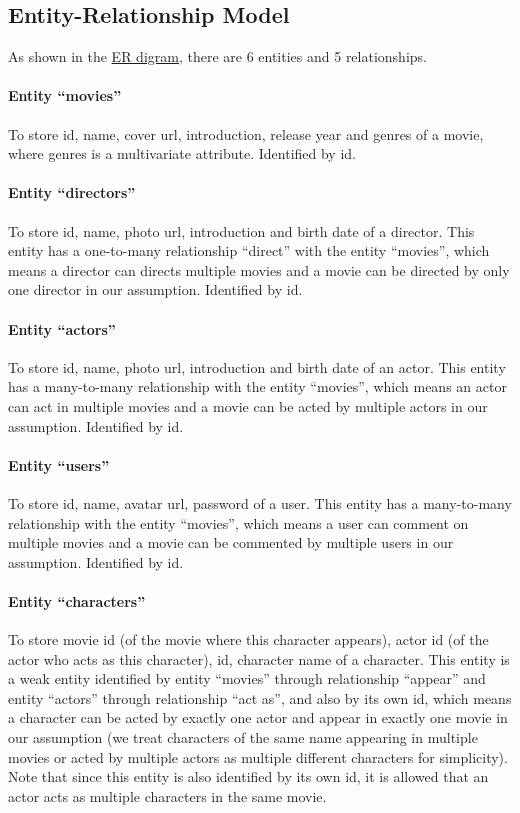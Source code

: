 \begin{CJK*}{UTF8}{gbsn}
\subsection{Entity-Relationship Model}
As shown in the \hyperref[ERD]{ER digram}, there are 6 entities and 5 relationships. 
\paragraph{Entity ``movies''}
To store id, name, cover url, introduction, release year and genres of a movie, where genres is a multivariate attribute. Identified by id. 
\paragraph{Entity ``directors''}
To store id, name, photo url, introduction and birth date of a director. This entity has a one-to-many relationship ``direct'' with the entity ``movies'', which means a director can directs multiple movies and a movie can be directed by only one director in our assumption. Identified by id. 
\paragraph{Entity ``actors''}
To store id, name, photo url, introduction and birth date of an actor. This entity has a many-to-many relationship with the entity ``movies'', which means an actor can act in multiple movies and a movie can be acted by multiple actors in our assumption. Identified by id. 
\paragraph{Entity ``users''}
To store id, name, avatar url, password of a user. This entity has a many-to-many relationship with the entity ``movies'', which means a user can comment on multiple movies and a movie can be commented by multiple users in our assumption. Identified by id. 
\paragraph{Entity ``characters''}
To store movie id (of the movie where this character appears), actor id (of the actor who acts as this character), id, character name of a character. This entity is a weak entity identified by entity ``movies'' through relationship ``appear'' and entity ``actors'' through relationship ``act as'', and also by its own id, which means a character can be acted by exactly one actor and appear in exactly one movie in our assumption (we treat characters of the same name appearing in multiple movies or acted by multiple actors as multiple different characters for simplicity). Note that since this entity is also identified by its own id, it is allowed that an actor acts as multiple characters in the same movie. 

\end{CJK*}
